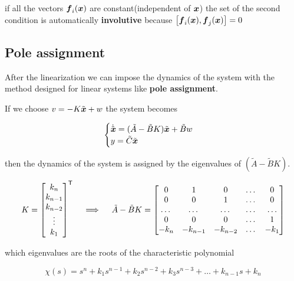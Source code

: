 \begin{nb}if all the vectors $\boldsymbol{f}_i(\boldsymbol{x})$ are constant(independent of $\boldsymbol{x}$) the set of the second condition  is automatically \textbf{involutive} because $\left[ \boldsymbol{f}_i(\boldsymbol{x}), \boldsymbol{f}_j(\boldsymbol{x}) \right] = 0$\end{nb}

\subsection{Pole assignment}

After the linearization we can impose the dynamics of the system with the method designed for linear systems like \textbf{pole assignment}.

If we choose $v = - K \tilde{\boldsymbol{x}} + w$ the system becomes

\[
    \begin{cases}
        \dot{\tilde{\boldsymbol{x}}} = (\tilde A - \tilde B K) \tilde{\boldsymbol{x}} + \tilde B w \\
        y = \tilde C \tilde{\boldsymbol{x}}
    \end{cases}
\]

then the dynamics of the system is assigned by the eigenvalues of $(\tilde A - \tilde B K)$.

\begin{gather*}
    K = \begin{bmatrix}
    k_n \\ k_{n-1} \\ k_{n-2} \\ \vdots \\ k_1
    \end{bmatrix}^{\mathsf{T}}
    \quad \implies \quad
    \tilde A - \tilde B K = \begin{bmatrix}
        0 & 1 & 0 & \dots & 0 \\
        0 & 0 & 1 & \dots & 0 \\
        \dots & \dots & \dots & \dots & \dots \\
        0 & 0 & 0 & \dots & 1 \\
        -k_n & -k_{n-1} & -k_{n-2} & \dots & -k_1 \\
    \end{bmatrix}
\end{gather*}

which eigenvalues are the roots of the characteristic polynomial

\[
    \chi(s) = s^n + k_1 s^{n-1} + k_2 s^{n-2} + k_3 s^{n-3} + \dots + k_{n-1} s + k_n
\]
